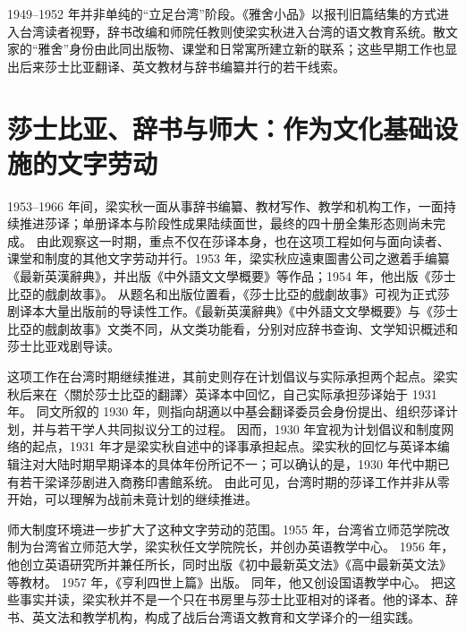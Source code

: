\documentclass[UTF8,a4paper,zihao=-4,fontset=none]{ctexart}
\begin{document}
1949--1952 年并非单纯的“立足台湾”阶段。《雅舍小品》以报刊旧篇结集的方式进入台湾读者视野，辞书改编和师院任教则使梁实秋进入台湾的语文教育系统。散文家的“雅舍”身份由此同出版物、课堂和日常寓所建立新的联系；这些早期工作也显出后来莎士比亚翻译、英文教材与辞书编纂并行的若干线索。

\section{莎士比亚、辞书与师大：作为文化基础设施的文字劳动}

1953--1966 年间，梁实秋一面从事辞书编纂、教材写作、教学和机构工作，一面持续推进莎译；单册译本与阶段性成果陆续面世，最终的四十册全集形态则尚未完成。\autocite{nmtl_liang_chronology,liang1974_on_translating_shakespeare,shakespeare1968_liang_quanji} 由此观察这一时期，重点不仅在莎译本身，也在这项工程如何与面向读者、课堂和制度的其他文字劳动并行。1953 年，梁实秋应遠東圖書公司之邀着手编纂《最新英漢辭典》，并出版《中外語文文學概要》等作品；1954 年，他出版《莎士比亞的戲劇故事》。\autocite{nmtl_liang_chronology} 从题名和出版位置看，《莎士比亞的戲劇故事》可视为正式莎剧译本大量出版前的导读性工作。《最新英漢辭典》《中外語文文學概要》与《莎士比亞的戲劇故事》文类不同，从文类功能看，分别对应辞书查询、文学知识概述和莎士比亚戏剧导读。

这项工作在台湾时期继续推进，其前史则存在计划倡议与实际承担两个起点。梁实秋后来在〈關於莎士比亞的翻譯〉英译本中回忆，自己实际承担莎译始于 1931 年。\autocite{liang1974_on_translating_shakespeare} 同文所叙的 1930 年，则指向胡適以中基会翻译委员会身份提出、组织莎译计划，并与若干学人共同拟议分工的过程。\autocite{liang1974_on_translating_shakespeare} 因而，1930 年宜视为计划倡议和制度网络的起点，1931 年才是梁实秋自述中的译事承担起点。梁实秋的回忆与英译本编辑注对大陆时期早期译本的具体年份所记不一；可以确认的是，1930 年代中期已有若干梁译莎剧进入商務印書館系统。\autocite{liang1974_on_translating_shakespeare} 由此可见，台湾时期的莎译工作并非从零开始，可以理解为战前未竟计划的继续推进。

师大制度环境进一步扩大了这种文字劳动的范围。1955 年，台湾省立师范学院改制为台湾省立师范大学，梁实秋任文学院院长，并创办英语教学中心。\autocite{nmtl_liang_chronology,ntnu_liang_house_chronology} 1956 年，他创立英语研究所并兼任所长，同时出版《初中最新英文法》《高中最新英文法》等教材。\autocite{nmtl_liang_chronology} 1957 年，《亨利四世上篇》出版。\autocite{nmtl_liang_chronology,liang1974_on_translating_shakespeare} 同年，他又创设国语教学中心。\autocite{nmtl_liang_chronology} 把这些事实并读，梁实秋并不是一个只在书房里与莎士比亚相对的译者。他的译本、辞书、英文法和教学机构，构成了战后台湾语文教育和文学译介的一组实践。
\end{document}
